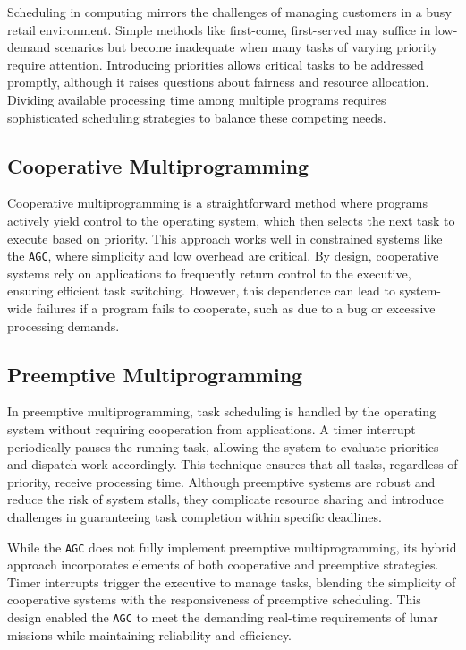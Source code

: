 \documentclass[refcap, oxford]{ahsan}
\begin{document}
Scheduling in computing mirrors the challenges of managing customers in a busy retail environment. Simple methods like first-come, first-served may suffice in low-demand scenarios but become inadequate when many tasks of varying priority require attention. Introducing priorities allows critical tasks to be addressed promptly, although it raises questions about fairness and resource allocation. Dividing available processing time among multiple programs requires sophisticated scheduling strategies to balance these competing needs.

\subsection{Cooperative Multiprogramming}

Cooperative multiprogramming is a straightforward method where programs actively yield control to the operating system, which then selects the next task to execute based on priority. This approach works well in constrained systems like the \texttt{AGC}, where simplicity and low overhead are critical. By design, cooperative systems rely on applications to frequently return control to the executive, ensuring efficient task switching. However, this dependence can lead to system-wide failures if a program fails to cooperate, such as due to a bug or excessive processing demands.

\subsection{Preemptive Multiprogramming}

In preemptive multiprogramming, task scheduling is handled by the operating system without requiring cooperation from applications. A timer interrupt periodically pauses the running task, allowing the system to evaluate priorities and dispatch work accordingly. This technique ensures that all tasks, regardless of priority, receive processing time. Although preemptive systems are robust and reduce the risk of system stalls, they complicate resource sharing and introduce challenges in guaranteeing task completion within specific deadlines.

While the \texttt{AGC} does not fully implement preemptive multiprogramming, its hybrid approach incorporates elements of both cooperative and preemptive strategies. Timer interrupts trigger the executive to manage tasks, blending the simplicity of cooperative systems with the responsiveness of preemptive scheduling. This design enabled the \texttt{AGC} to meet the demanding real-time requirements of lunar missions while maintaining reliability and efficiency.
\end{document}
